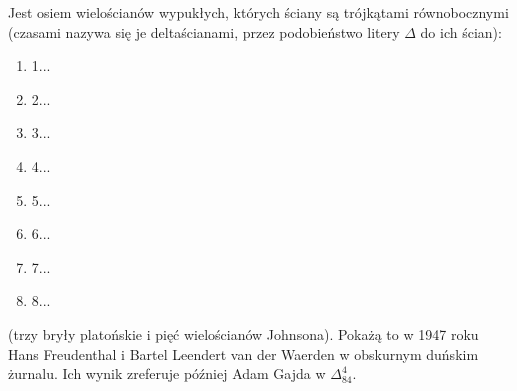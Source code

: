Jest osiem wielościanów wypukłych, których ściany są trójkątami równobocznymi (czasami nazywa się je deltaścianami, przez podobieństwo litery $\Delta$ do ich ścian):
\begin{enumerate}
\item 1...
\item 2...
\item 3...
\item 4...
\item 5...
\item 6...
\item 7...
\item 8...
\end{enumerate}
(trzy bryły platońskie i pięć wielościanów Johnsona).
Pokażą to w 1947 roku Hans Freudenthal i Bartel Leendert van der Waerden \cite{Freudenthal_1947} w obskurnym duńskim żurnalu.
Ich wynik zreferuje później Adam Gajda w $\Delta_{84}^{4}$.